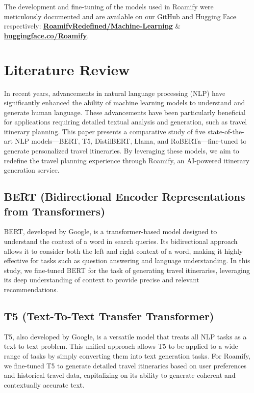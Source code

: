 \documentclass[conference]{IEEEtran}
\begin{document}
    The development and fine-tuning of the models used in Roamify were meticulously documented and are available on our GitHub and Hugging Face respectively: \href{https://github.com/RoamifyRedefined/Machine-Learning}{\textbf{RoamifyRedefined/Machine-Learning}} \& \href{https://huggingface.co/Roamify}{\textbf{huggingface.co/Roamify}}.

\section{Literature Review}

    In recent years, advancements in natural language processing (NLP) have significantly enhanced the ability of machine learning models to understand and generate human language. These advancements have been particularly beneficial for applications requiring detailed textual analysis and generation, such as travel itinerary planning. This paper presents a comparative study of five state-of-the-art NLP models—BERT, T5, DistilBERT, Llama, and RoBERTa—fine-tuned to generate personalized travel itineraries. By leveraging these models, we aim to redefine the travel planning experience through Roamify, an AI-powered itinerary generation service.

    \subsection{BERT (Bidirectional Encoder Representations from Transformers)}
        BERT, developed by Google, is a transformer-based model designed to understand the context of a word in search queries. Its bidirectional approach allows it to consider both the left and right context of a word, making it highly effective for tasks such as question answering and language understanding. In this study, we fine-tuned BERT for the task of generating travel itineraries, leveraging its deep understanding of context to provide precise and relevant recommendations.

    \subsection{T5 (Text-To-Text Transfer Transformer)}
        T5, also developed by Google, is a versatile model that treats all NLP tasks as a text-to-text problem. This unified approach allows T5 to be applied to a wide range of tasks by simply converting them into text generation tasks. For Roamify, we fine-tuned T5 to generate detailed travel itineraries based on user preferences and historical travel data, capitalizing on its ability to generate coherent and contextually accurate text.
\end{document}
